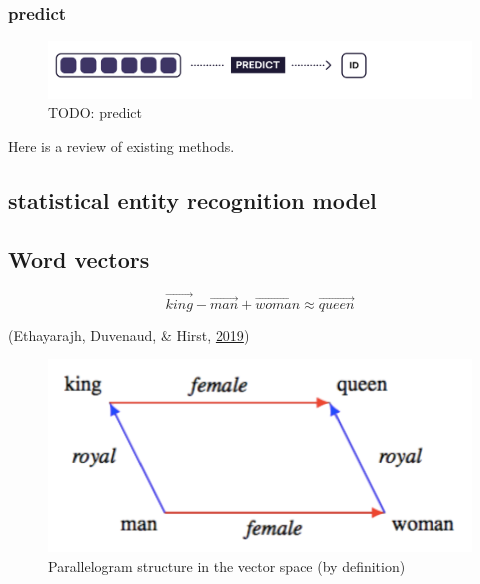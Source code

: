 \documentclass[12pt,a4paper,]{scrartcl}
\begin{document}
\hypertarget{predict}{%
\subsubsection{predict}\label{predict}}

\begin{figure}[H]

{\centering \includegraphics{assets/deep-learning-formula-nlp_predict.pdf} 

}

\caption{TODO: predict}\label{fig:formula-predict}
\end{figure}

Here is a review of existing methods.

\hypertarget{statistical-entity-recognition-model}{%
\subsection{statistical entity recognition model}\label{statistical-entity-recognition-model}}

\hypertarget{word-vectors}{%
\subsection{Word vectors}\label{word-vectors}}

\[\vec{king} - \vec{man} + \vec{woman} \approx \vec{queen}\]

(Ethayarajh, Duvenaud, \& Hirst, \protect\hyperlink{ref-ethayarajh-etal-2019-towards}{2019})

\begin{figure}[H]

{\centering \includegraphics{assets/parallelogram.pdf} 

}

\caption{Parallelogram structure in the vector space (by definition)}\label{fig:vec-parallelogram}
\end{figure}
\end{document}
